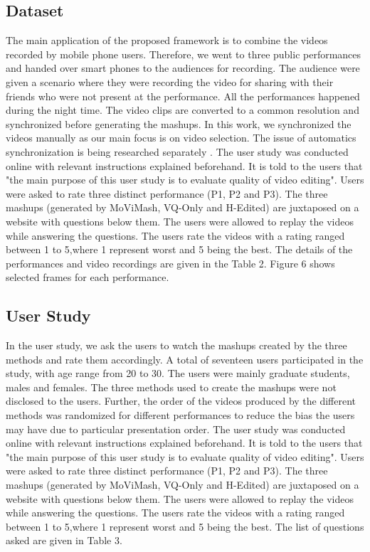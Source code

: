\documentclass{sig-alternate}
\begin{document}
\subsection{Dataset}
The main application of the proposed framework is to combine the videos recorded by mobile phone users. Therefore, we went to three public performances and handed over smart phones to the audiences for recording. The audience were given a scenario where they were recording the video for sharing with their friends who were not present at the performance. All the performances happened during the night time. The video clips are converted to a common resolution and synchronized before generating the mashups. In this work, we synchronized the videos manually as our main focus is on video selection. The issue of automatics synchronization is being researched separately \cite{frakes1992information}. The user study was conducted online with relevant instructions explained beforehand. It is told to the users that "the main purpose of this user study is to evaluate quality of video editing". Users were asked to rate three distinct performance (P1, P2 and P3). The three mashups (generated by MoViMash, VQ-Only and H-Edited) are juxtaposed on a website with questions below them. The users were allowed to replay the videos while answering the questions. The users rate the videos with a rating ranged between 1 to 5,where 1 represent worst and 5 being the best. The details of the performances and video recordings are given in the Table 2. Figure 6 shows selected frames for each performance.


\subsection{User Study}
 In the user study, we ask the users to watch the mashups created by the three methods and rate them accordingly. A total of seventeen users participated in the study, with age range from 20 to 30. The users were mainly graduate students, males and females. The three methods used to create the mashups were not disclosed to the users. Further, the order of the videos produced by the different methods was randomized for different performances to reduce the bias the users may have due to particular presentation order. The user study was conducted online with relevant instructions explained beforehand. It is told to the users that "the main purpose of this user study is to evaluate quality of video editing". Users were asked to rate three distinct performance (P1, P2 and P3). The three mashups (generated by MoViMash, VQ-Only and H-Edited) are juxtaposed on a website with questions below them. The users were allowed to replay the videos while answering the questions. The users rate the videos with a rating ranged between 1 to 5,where 1 represent worst and 5 being the best. The list of questions asked are given in Table 3. 
\end{document}
